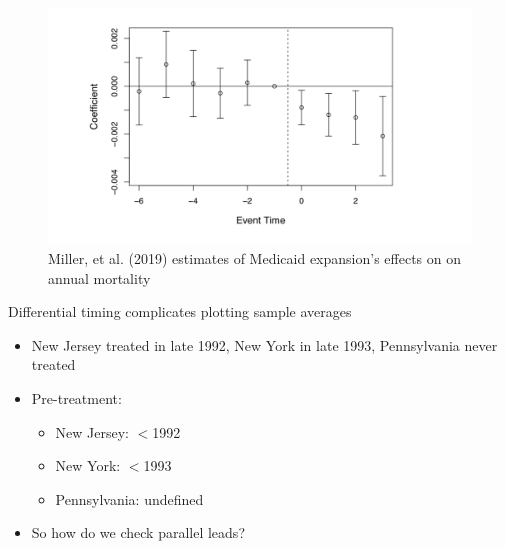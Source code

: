 \documentclass{beamer}
\begin{document}
\begin{frame}[plain]

	\begin{figure}
	\includegraphics[scale=0.3]{./lecture_includes/Miller_Medicaid4.png}
	\caption{Miller, et al. (2019) estimates of Medicaid expansion's effects on on annual mortality}
	\end{figure}

\end{frame}


\begin{frame}{Differential timing complicates plotting sample averages}

\begin{itemize}
\item New Jersey treated in late 1992, New York in late 1993, Pennsylvania never treated
\item Pre-treatment:
	\begin{itemize}
	\item New Jersey: $<$1992
	\item New York: $<$1993
	\item Pennsylvania: undefined
	\end{itemize}
\item So how do we check parallel leads?

\end{itemize}

\end{frame}
\end{document}
